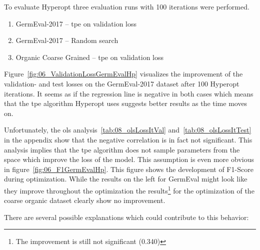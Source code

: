 To evaluate Hyperopt three evaluation runs with 100 iterations were performed.

\begin{enumerate}
    \item GermEval-2017 -- \gls{tpe} on validation loss
    \item GermEval-2017 -- Random search
    \item Organic Coarse Grained -- \gls{tpe} on validation loss
\end{enumerate}

Figure~\ref{fig:06_ValidationLossGermEvalHp} visualizes the improvement of the validation- and test losses on the GermEval-2017 dataset after 100 Hyperopt iterations. It seems as if the regression line is negative in both cases which means that the \gls{tpe} algorithm Hyperopt uses suggests better results as the time moves on.

Unfortunately, the \gls{ols} analysis~\ref{tab:08_olsLossItVal} and~\ref{tab:08_olsLossItTest} in the appendix show that the negative correlation is in fact not significant. This analysis implies that the \gls{tpe} algorithm does not sample parameters from the space which improve the loss of the model. This assumption is even more obvious in figure~\ref{fig:06_F1GermEvalHp}. This figure shows the development of F1-Score during optimization. While the results on the left for GermEval might look like they improve throughout the optimization the results\footnote{The improvement is still not significant {(0.340)}} for the optimization of the coarse organic dataset clearly show no improvement.
\medskip

There are several possible explanations which could contribute to this behavior:

